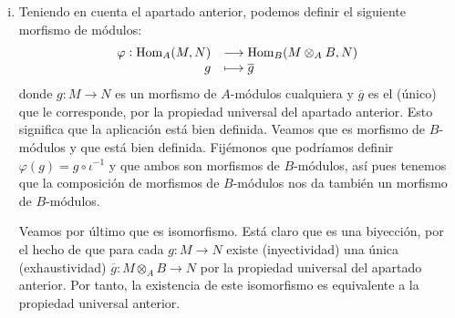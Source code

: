 \documentclass[../../../main.tex]{subfiles}
\begin{document}
\begin{sol}
\begin{enumerate}[(i)]
    \item Teniendo en cuenta el apartado anterior, podemos definir el siguiente morfismo de módulos:
    \begin{equation}
        \notag
        \begin{array}{rl}
            \varphi:\operatorname{Hom}_A(M,N) & \longrightarrow \operatorname{Hom}_B(M\otimes_AB,N) \\
            g & \longmapsto \overline{g}
        \end{array}
    \end{equation}
    donde $g:M\to N$ es un morfismo de $A$-módulos cualquiera y $\overline{g}$ es el (único) que le corresponde, por la propiedad universal del apartado anterior. Esto significa que la aplicación está bien definida. Veamos que es morfismo de $B$-módulos y que está bien definida. Fijémonos que podríamos definir $\varphi(g) = g\circ\iota^{-1}$ y que ambos son morfismos de $B$-módulos, así pues tenemos que la composición de morfismos de $B$-módulos nos da también un morfismo de $B$-módulos. 
    
    Veamos por último que es isomorfismo. Está claro que es una biyección, por el hecho de que para cada $g:M\to N$ existe (inyectividad) una única (exhaustividad) $\overline{g}:M\otimes_AB\to N$ por la propiedad universal del apartado anterior. Por tanto, la existencia de este isomorfismo es equivalente a la propiedad universal anterior. 
\end{enumerate}
\end{sol}
\end{document}

